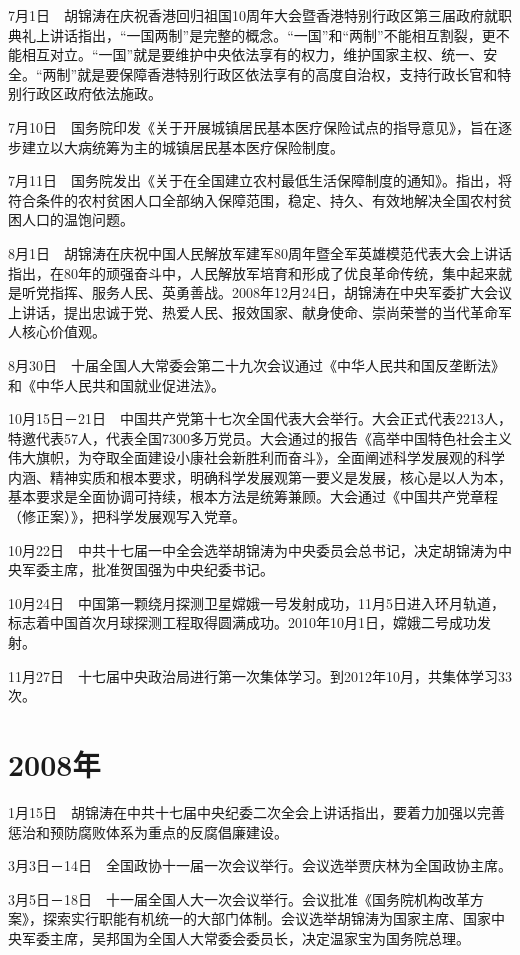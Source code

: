 \documentclass[10pt,a4paper,twocolumn]{book}
\begin{document}
7月1日　胡锦涛在庆祝香港回归祖国10周年大会暨香港特别行政区第三届政府就职典礼上讲话指出，“一国两制”是完整的概念。“一国”和“两制”不能相互割裂，更不能相互对立。“一国”就是要维护中央依法享有的权力，维护国家主权、统一、安全。“两制”就是要保障香港特别行政区依法享有的高度自治权，支持行政长官和特别行政区政府依法施政。

7月10日　国务院印发《关于开展城镇居民基本医疗保险试点的指导意见》，旨在逐步建立以大病统筹为主的城镇居民基本医疗保险制度。

7月11日　国务院发出《关于在全国建立农村最低生活保障制度的通知》。指出，将符合条件的农村贫困人口全部纳入保障范围，稳定、持久、有效地解决全国农村贫困人口的温饱问题。

8月1日　胡锦涛在庆祝中国人民解放军建军80周年暨全军英雄模范代表大会上讲话指出，在80年的顽强奋斗中，人民解放军培育和形成了优良革命传统，集中起来就是听党指挥、服务人民、英勇善战。2008年12月24日，胡锦涛在中央军委扩大会议上讲话，提出忠诚于党、热爱人民、报效国家、献身使命、崇尚荣誉的当代革命军人核心价值观。

8月30日　十届全国人大常委会第二十九次会议通过《中华人民共和国反垄断法》和《中华人民共和国就业促进法》。

10月15日－21日　中国共产党第十七次全国代表大会举行。大会正式代表2213人，特邀代表57人，代表全国7300多万党员。大会通过的报告《高举中国特色社会主义伟大旗帜，为夺取全面建设小康社会新胜利而奋斗》，全面阐述科学发展观的科学内涵、精神实质和根本要求，明确科学发展观第一要义是发展，核心是以人为本，基本要求是全面协调可持续，根本方法是统筹兼顾。大会通过《中国共产党章程（修正案）》，把科学发展观写入党章。

10月22日　中共十七届一中全会选举胡锦涛为中央委员会总书记，决定胡锦涛为中央军委主席，批准贺国强为中央纪委书记。

10月24日　中国第一颗绕月探测卫星嫦娥一号发射成功，11月5日进入环月轨道，标志着中国首次月球探测工程取得圆满成功。2010年10月1日，嫦娥二号成功发射。

11月27日　十七届中央政治局进行第一次集体学习。到2012年10月，共集体学习33次。

\section{2008年}

1月15日　胡锦涛在中共十七届中央纪委二次全会上讲话指出，要着力加强以完善惩治和预防腐败体系为重点的反腐倡廉建设。

3月3日－14日　全国政协十一届一次会议举行。会议选举贾庆林为全国政协主席。

3月5日－18日　十一届全国人大一次会议举行。会议批准《国务院机构改革方案》，探索实行职能有机统一的大部门体制。会议选举胡锦涛为国家主席、国家中央军委主席，吴邦国为全国人大常委会委员长，决定温家宝为国务院总理。
\end{document}
